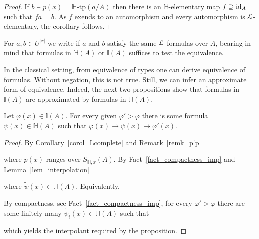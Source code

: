 \documentclass[11pt,oneside]{amsart}
\renewcommand*{\emph}[1]{%
   \smash{\tikz[baseline]\node[rectangle, fill=teal!25, rounded corners, inner xsep=0.5ex, inner ysep=0.2ex, anchor=base, minimum height = 2.7ex]{#1};}}
\begin{document}
\begin{proof}
  If $b\models p(x)=\mathds{H}\mbox{-tp}(a/A)$ then there is an $\mathds{H}$-elementary map $f\supseteq{\rm id}_A$ such that $fa=b$.
  As $f$ exends to an automorphism and every automorphism is ${\EuScript L}$-elementary, the corollary follows.
\end{proof}

For $a,b\in U^{|x|}$ we write \emph{$a\equiv_Ab$\/} if $a$ and $b$ satisfy the same ${\EuScript L}$-formulas over $A$, bearing in mind that formulas in $\mathds{H}(A)$ or $\mathds{I}(A)$ suffices to test the equivalence.

In the classical setting, from equivalence of types one can derive equivalence of formulas.
Without negation, this is not true.
Still, we can infer an approximate form of equivalence.
Indeed, the next two propositions show that formulas in $\mathds{I}(A)$ are approximated by formulas in $\mathds{H}(A)$.

\begin{proposition}\label{prop_LHapprox1}
  Let $\varphi(x)\in\mathds{I}(A)$.
  For every given $\varphi'>\varphi$ there is some formula $\psi(x)\in\mathds{H}(A)$ such that $\varphi(x)\rightarrow\psi(x)\rightarrow\varphi'(x)$.
\end{proposition}

\begin{proof}
  By Corollary~\ref{corol_Lcomplete} and Remark~\ref{remk_p'p}


  where $p(x)$ ranges over $S_{\mathds{H},x}(A)$.
  By Fact~\ref{fact_compactness_imp} and Lemma~\ref{lem_interpolation}


  where $\tilde{\psi}(x)\in\mathds{H}(A)$.
  Equivalently,


  By compactness, see Fact~\ref{fact_compactness_imp}, for every $\varphi'>\varphi$ there are some finitely many $\tilde{\psi}_i(x)\in\mathds{H}(A)$ such that


  which yields the interpolant required by the proposition.
\end{proof}
\end{document}
